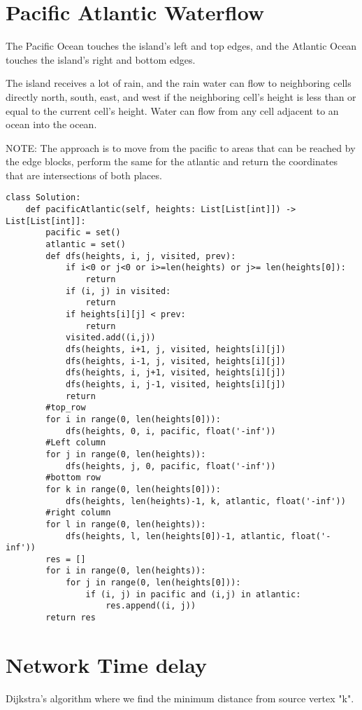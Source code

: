 \documentclass[24pt, a4]{article}
\begin{document}
\section{Pacific Atlantic Waterflow}
The Pacific Ocean touches the island's left and top edges, 
and the Atlantic Ocean touches the island's right and bottom edges.

The island receives a lot of rain, and the rain water can flow to neighboring 
cells directly north, south, east, and west if the neighboring cell's height 
is less than or equal to the current cell's height. Water can flow from any 
cell adjacent to an ocean into the ocean.

NOTE: The approach is to move from the pacific to areas that can be reached by
the edge blocks, perform the same for the atlantic and return the coordinates
that are intersections of both places.
\begin{lstlisting}
class Solution:
    def pacificAtlantic(self, heights: List[List[int]]) -> List[List[int]]:
        pacific = set()
        atlantic = set()
        def dfs(heights, i, j, visited, prev):
            if i<0 or j<0 or i>=len(heights) or j>= len(heights[0]):
                return
            if (i, j) in visited:
                return
            if heights[i][j] < prev:
                return
            visited.add((i,j))
            dfs(heights, i+1, j, visited, heights[i][j])
            dfs(heights, i-1, j, visited, heights[i][j])
            dfs(heights, i, j+1, visited, heights[i][j])
            dfs(heights, i, j-1, visited, heights[i][j])
            return
        #top_row
        for i in range(0, len(heights[0])):
            dfs(heights, 0, i, pacific, float('-inf'))
        #Left column
        for j in range(0, len(heights)):
            dfs(heights, j, 0, pacific, float('-inf'))
        #bottom row
        for k in range(0, len(heights[0])):
            dfs(heights, len(heights)-1, k, atlantic, float('-inf'))
        #right column
        for l in range(0, len(heights)):
            dfs(heights, l, len(heights[0])-1, atlantic, float('-inf'))
        res = []
        for i in range(0, len(heights)):
            for j in range(0, len(heights[0])):
                if (i, j) in pacific and (i,j) in atlantic:
                    res.append((i, j))
        return res
\end{lstlisting}
\newpage
\section{Network Time delay}
Dijkstra's algorithm where we find the minimum distance from source vertex "k".
\end{document}
